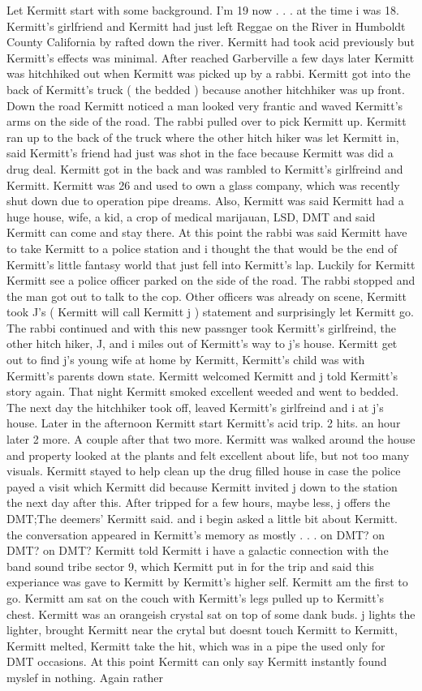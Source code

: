 \documentclass[12pt]{book}
\begin{document}
Let Kermitt start with some background. I'm 19 now . . .  at the time i was 18. Kermitt's girlfriend and Kermitt had just left Reggae on the River in Humboldt County California by rafted down the river. Kermitt had took acid previously but Kermitt's effects was minimal. After reached Garberville a few days later Kermitt was hitchhiked out when Kermitt was picked up by a rabbi. Kermitt got into the back of Kermitt's truck ( the bedded ) because another hitchhiker was up front. Down the road Kermitt noticed a man looked very frantic and waved Kermitt's arms on the side of the road. The rabbi pulled over to pick Kermitt up. Kermitt ran up to the back of the truck where the other hitch hiker was let Kermitt in, said Kermitt's friend had just was shot in the face because Kermitt was did a drug deal. Kermitt got in the back and was rambled to Kermitt's girlfreind and Kermitt. Kermitt was 26 and used to own a glass company, which was recently shut down due to operation pipe dreams. Also, Kermitt was said Kermitt had a huge house, wife, a kid, a crop of medical marijauan, LSD, DMT and said Kermitt can come and stay there. At this point the rabbi was said Kermitt have to take Kermitt to a police station and i thought the that would be the end of Kermitt's little fantasy world that just fell into Kermitt's lap. Luckily for Kermitt Kermitt see a police officer parked on the side of the road. The rabbi stopped and the man got out to talk to the cop. Other officers was already on scene, Kermitt took J's ( Kermitt will call Kermitt j ) statement and surprisingly let Kermitt go. The rabbi continued and with this new passnger took Kermitt's girlfreind, the other hitch hiker, J, and i miles out of Kermitt's way to j's house. Kermitt get out to find j's young wife at home by Kermitt, Kermitt's child was with Kermitt's parents down state. Kermitt welcomed Kermitt and j told Kermitt's story again. That night Kermitt smoked excellent weeded and went to bedded. The next day the hitchhiker took off, leaved Kermitt's girlfreind and i at j's house. Later in the afternoon Kermitt start Kermitt's acid trip. 2 hits. an hour later 2 more. A couple after that two more. Kermitt was walked around the house and property looked at the plants and felt excellent about life, but not too many visuals. Kermitt stayed to help clean up the drug filled house in case the police payed a visit which Kermitt did because Kermitt invited j down to the station the next day after this. After tripped for a few hours, maybe less, j offers the DMT;The deemers' Kermitt said. and i begin asked a little bit about Kermitt. the conversation appeared in Kermitt's memory as mostly . . .  on DMT? on DMT? on DMT? Kermitt told Kermitt i have a galactic connection with the band sound tribe sector 9, which Kermitt put in for the trip and said this experiance was gave to Kermitt by Kermitt's higher self. Kermitt am the first to go. Kermitt am sat on the couch with Kermitt's legs pulled up to Kermitt's chest. Kermitt was an orangeish crystal sat on top of some dank buds. j lights the lighter, brought Kermitt near the crytal but doesnt touch Kermitt to Kermitt, Kermitt melted, Kermitt take the hit, which was in a pipe the used only for DMT occasions. At this point Kermitt can only say Kermitt instantly found myslef in nothing. Again rather 
\end{document}
